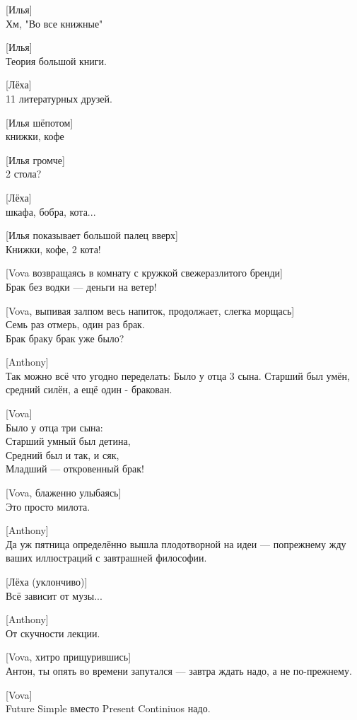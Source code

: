 [Илья]\\
Хм, "Во все книжные"


[Илья]\\
Теория большой книги.


[Лёха]\\
11 литературных друзей.


[Илья шёпотом]\\
книжки, кофе


[Илья громче]\\
2 стола?


[Лёха]\\
шкафа, бобра, кота...


[Илья показывает большой палец вверх]\\
Книжки, кофе, 2 кота!


[Vova возвращаясь в комнату с кружкой свежеразлитого бренди]\\
Брак без водки — деньги на ветер!


[Vova, выпивая залпом весь напиток, продолжает, слегка морщась]\\
Семь раз отмерь, один раз брак.\\
Брак браку брак уже было?


[Anthony]\\
Так можно всё что угодно переделать: Было у отца 3 сына. Старший был умён, средний силён, а ещё один - бракован.


[Vova]\\
Было у отца три сына:\\
Старший умный был детина,\\
Средний был и так, и сяк,\\
Младший — откровенный брак!


[Vova, блаженно улыбаясь]\\
Это просто милота.


[Anthony]\\
Да уж пятница определённо вышла плодотворной на идеи --- попрежнему жду ваших иллюстраций с завтрашней философии.


[Лёха (уклончиво)]\\
Всё зависит от музы...


[Anthony]\\
От скучности лекции.


[Vova, хитро прищурившись]\\
Антон, ты опять во времени запутался — завтра ждать надо, а не по-прежнему.


[Vova]\\
Future Simple вместо Present Continiuos надо.


